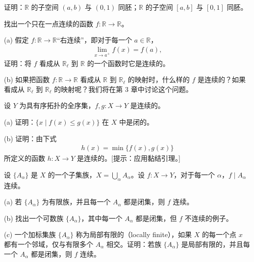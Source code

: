 \documentclass[../../main.tex]{subfiles}
\begin{document}
\begin{exercise}\label{exercise:ch02-连续函数-5}
证明：$\mathbb{R}$ 的子空间 $(a, b)$ 与 $(0, 1)$ 同胚；$\mathbb{R}$ 的子空间 $[a, b]$ 与 $[0, 1]$ 同胚。
\end{exercise}

\begin{exercise}\label{exercise:ch02-连续函数-6}
找出一个只在一点连续的函数 $f: \mathbb{R} \rightarrow \mathbb{R}$。
\end{exercise}

\begin{exercise}\label{exercise:ch02-连续函数-7}
(a) 假定 $f: \mathbb{R} \rightarrow \mathbb{R}$“右连续”，即对于每一个 $a \in \mathbb{R}$，
\begin{align*}
\lim_{x \rightarrow a^{+}} f(x) = f(a),
\end{align*}
证明：将 $f$ 看成从 $\mathbb{R}_{\ell}$ 到 $\mathbb{R}$ 的一个函数时它是连续的。

(b) 如果把函数 $f: \mathbb{R} \rightarrow \mathbb{R}$ 看成从 $\mathbb{R}$ 到 $\mathbb{R}_{\ell}$ 的映射时，什么样的 $f$ 是连续的？如果看成从 $\mathbb{R}_{\ell}$ 到 $\mathbb{R}_{\ell}$ 的映射呢？我们将在第 3 章中讨论这个问题。
\end{exercise}

\begin{exercise}\label{exercise:ch02-连续函数-8}
设 $Y$ 为具有序拓扑的全序集，$f, g: X \rightarrow Y$ 是连续的。

(a) 证明：$\{x \mid f(x) \leqslant g(x)\}$ 在 $X$ 中是闭的。

(b) 证明：由下式
\begin{align*}
h(x) = \min\{f(x), g(x)\}
\end{align*}
所定义的函数 $h: X \rightarrow Y$ 是连续的。[提示：应用黏结引理。]
\end{exercise}

\begin{exercise}\label{exercise:ch02-连续函数-9}
设 $\{A_{\alpha}\}$ 是 $X$ 的一个子集族，$X = \bigcup_{\alpha} A_{\alpha}$。设 $f: X \rightarrow Y$，对于每一个 $\alpha$，$f \mid A_{\alpha}$ 连续。

(a) 若 $\{A_{\alpha}\}$ 为有限族，并且每一个 $A_{\alpha}$ 都是闭集，则 $f$ 连续。

(b) 找出一个可数族 $\{A_{\alpha}\}$，其中每一个 $A_{\alpha}$ 都是闭集，但 $f$ 不连续的例子。

(c) 一个加标集族 $\{A_{\alpha}\}$ 称为局部有限的（locally finite），如果 $X$ 的每一个点 $x$ 都有一个邻域，仅与有限多个 $A_{\alpha}$ 相交。证明：若族 $\{A_{\alpha}\}$ 是局部有限的，并且每一个 $A_{\alpha}$ 都是闭集，则 $f$ 连续。
\end{exercise}
\end{document}
